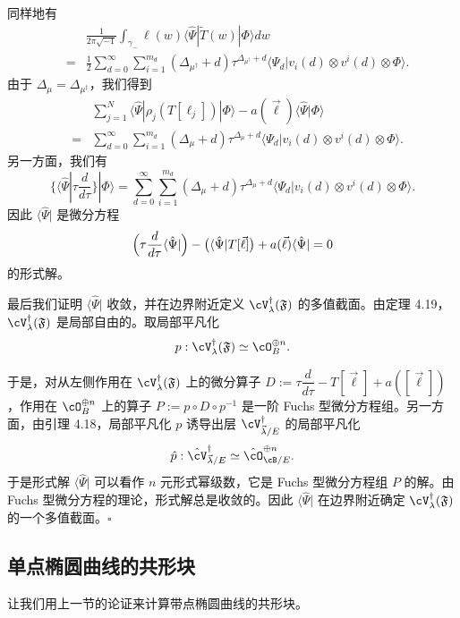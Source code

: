 同样地有
\[
\begin{array}{rcl}
&&\displaystyle\frac{1}{2\pi\sqrt{-1}}\int_{\gamma_-}\ell(w)\langle\hat\Psi|\tilde T(w)|\Phi\rangle dw\\[12pt]
&=& \displaystyle\frac12\sum_{d=0}^{\infty}\sum_{i=1}^{m_d}
(\Delta_{\mu^\dagger}+d)\tau^{\Delta_{\mu^\dagger}+d}
\langle\Psi_d|v_i(d)\otimes v^i(d)\otimes\Phi\rangle.
\end{array}
\]
由于 $\Delta_\mu=\Delta_{\mu^\dagger}$，我们得到
\[
\begin{array}{rcl}
&&\displaystyle\sum_{j=1}^{N}\langle\hat\Psi|\rho_j(T[\ell_j])|\Phi\rangle
-a(\vec\ell)\langle\hat\Psi|\Phi\rangle\\[12pt]
&=& \displaystyle\sum_{d=0}^{\infty}\sum_{i=1}^{m_d}
(\Delta_\mu+d)\tau^{\Delta_\mu+d}\langle\Psi_d|v_i(d)\otimes v^i(d)\otimes\Phi\rangle.
\end{array}
\]
另一方面，我们有
\[
\{\langle\hat\Psi|\tau\frac{d}{d\tau}\}|\Phi\rangle
=\sum_{d=0}^{\infty}\sum_{i=1}^{m_d}(\Delta_\mu+d)\tau^{\Delta_\mu+d}
\langle\Psi_d|v_i(d)\otimes v^i(d)\otimes\Phi\rangle.
\]
因此 $\langle\hat\Psi|$ 是微分方程
\[
\Bigl(\tau\frac{d}{d\tau}\langle\hat\Psi|\Bigr)-\bigl(\langle\hat\Psi|T[\vec\ell]\bigr)
+a(\vec\ell)\langle\hat\Psi|=0
\]
的形式解。

最后我们证明 $\langle\hat\Psi|$ 收敛，并在边界附近定义 $\cV^\dagger_\lambda(\mathfrak{F})$ 的多值截面。由定理 4.19，$\cV^\dagger_\lambda(\mathfrak{F})$ 是局部自由的。取局部平凡化
\[
p:\cV^\dagger_\lambda(\mathfrak{F})\simeq\cO_B^{\oplus n}.
\]

于是，对从左侧作用在 $\cV^\dagger_\lambda(\mathfrak{F})$ 上的微分算子 $D:=\tau\dfrac{d}{d\tau}-T[\vec\ell]+a([\vec\ell])$，作用在 $\cO_B^{\oplus n}$ 上的算子 $P:=p\circ D\circ p^{-1}$ 是一阶 Fuchs 型微分方程组。另一方面，由引理 4.18，局部平凡化 $p$ 诱导出层 $\cV^\dagger_{\vec\lambda/E}$ 的局部平凡化
\[
\hat p:\hat{\cV}^\dagger_{\vec\lambda/E}\simeq\hat\cO^{\oplus n}_{\cB/E}.
\]
于是形式解 $\langle\hat\Psi|$ 可以看作 $n$ 元形式幂级数，它是 Fuchs 型微分方程组 $P$ 的解。由 Fuchs 型微分方程的理论，形式解总是收敛的。因此 $\langle\hat\Psi|$ 在边界附近确定 $\cV^\dagger_\lambda(\mathfrak{F})$ 的一个多值截面。\hfill$\square$

\subsection{单点椭圆曲线的共形块}

让我们用上一节的论证来计算带点椭圆曲线的共形块。


